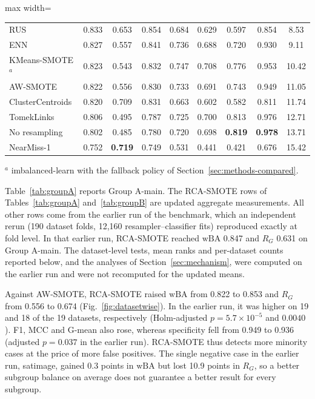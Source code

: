 \documentclass[preprint,nopreprintline]{elsarticle}
\theoremstyle{plain}
\theoremstyle{definition}
\newcommand{\wba}{\mathrm{wBA}}
\newcommand{\rg}{R_{G}}
\providecommand{\botrule}{\bottomrule}
\begin{document}
\begin{table}[!htb]
\begin{adjustbox}{max width=\textwidth}
\begin{tabular}{@{}lcccccccc@{}}
RUS & 0.833 & 0.653 & 0.854 & 0.684 & 0.629 & 0.597 & 0.854 & 8.53 \\
ENN & 0.827 & 0.557 & 0.841 & 0.736 & 0.688 & 0.720 & 0.930 & 9.11 \\
KMeans-SMOTE$^{a}$ & 0.823 & 0.543 & 0.832 & 0.747 & 0.708 & 0.776 & 0.953 & 10.42 \\
AW-SMOTE & 0.822 & 0.556 & 0.830 & 0.733 & 0.691 & 0.743 & 0.949 & 11.05 \\
ClusterCentroids & 0.820 & 0.709 & 0.831 & 0.663 & 0.602 & 0.582 & 0.811 & 11.74 \\
TomekLinks & 0.806 & 0.495 & 0.787 & 0.725 & 0.700 & 0.813 & 0.976 & 12.71 \\
No resampling & 0.802 & 0.485 & 0.780 & 0.720 & 0.698 & \textbf{0.819} & \textbf{0.978} & 13.71 \\
NearMiss-1 & 0.752 & \textbf{0.719} & 0.749 & 0.531 & 0.441 & 0.421 & 0.676 & 15.42 \\
\botrule
\end{tabular}
\end{adjustbox}
\par\smallskip\raggedright\footnotesize $^{a}$ imbalanced-learn with the fallback policy of Section~\ref{sec:methods-compared}.
\end{table}

Table~\ref{tab:groupA} reports Group A-main. The RCA-SMOTE rows of Tables~\ref{tab:groupA} and~\ref{tab:groupB} are updated aggregate measurements. All other rows come from the earlier run of the benchmark, which an independent rerun (190 dataset folds, 12,160 resampler--classifier fits) reproduced exactly at fold level. In that earlier run, RCA-SMOTE reached $\wba$ 0.847 and $\rg$ 0.631 on Group A-main. The dataset-level tests, mean ranks and per-dataset counts reported below, and the analyses of Section~\ref{sec:mechanism}, were computed on the earlier run and were not recomputed for the updated means.

Against AW-SMOTE, RCA-SMOTE raised $\wba$ from 0.822 to 0.853 and $\rg$ from 0.556 to 0.674 (Fig.~\ref{fig:datasetwise}). In the earlier run, it was higher on 19 and 18 of the 19 datasets, respectively (Holm-adjusted $p=5.7\times10^{-5}$ and $0.0040$). F1, MCC and G-mean also rose, whereas specificity fell from 0.949 to 0.936 (adjusted $p=0.037$ in the earlier run). RCA-SMOTE thus detects more minority cases at the price of more false positives. The single negative case in the earlier run, satimage, gained 0.3 points in $\wba$ but lost 10.9 points in $\rg$, so a better subgroup balance on average does not guarantee a better result for every subgroup.
\end{document}
